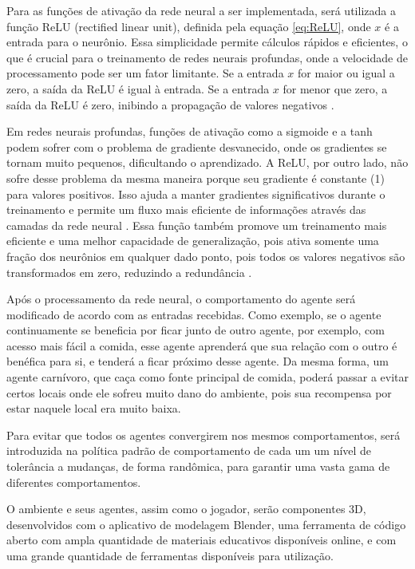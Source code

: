 Para as funções de ativação da rede neural a ser implementada, será utilizada a função ReLU (rectified linear unit), definida pela equação \eqref{eq:ReLU}, onde \( x \) é a entrada para o neurônio. Essa simplicidade permite cálculos rápidos e eficientes, o que é crucial para o treinamento de redes neurais profundas, onde a velocidade de processamento pode ser um fator limitante. Se a entrada \( x \) for maior ou igual a zero, a saída da ReLU é igual à entrada. Se a entrada \( x \) for menor que zero, a saída da ReLU é zero, inibindo a propagação de valores negativos \cite{krizhevsky2012imagenet}.

Em redes neurais profundas, funções de ativação como a sigmoide e a tanh podem sofrer com o problema de gradiente desvanecido, onde os gradientes se tornam muito pequenos, dificultando o aprendizado. A ReLU, por outro lado, não sofre desse problema da mesma maneira porque seu gradiente é constante (1) para valores positivos. Isso ajuda a manter gradientes significativos durante o treinamento e permite um fluxo mais eficiente de informações através das camadas da rede neural \cite{glorot2011understanding}. Essa função também promove um treinamento mais eficiente e uma melhor capacidade de generalização, pois ativa somente uma fração dos neurônios em qualquer dado ponto, pois todos os valores negativos são transformados em zero, reduzindo a redundância \cite{hinton2012layer}.

Após o processamento da rede neural, o comportamento do agente será modificado de acordo com as entradas recebidas. Como exemplo, se o agente continuamente se beneficia por ficar junto de outro agente, por exemplo, com acesso mais fácil a comida, esse agente aprenderá que sua relação com o outro é benéfica para si, e tenderá a ficar próximo desse agente. Da mesma forma, um agente carnívoro, que caça como fonte principal de comida, poderá passar a evitar certos locais onde ele sofreu muito dano do ambiente, pois sua recompensa por estar naquele local era muito baixa.

Para evitar que todos os agentes convergirem nos mesmos comportamentos, será introduzida na política padrão de comportamento de cada um um nível de tolerância a mudanças, de forma randômica, para garantir uma vasta gama de diferentes comportamentos.

O ambiente e seus agentes, assim como o jogador, serão componentes 3D, desenvolvidos com o aplicativo de modelagem Blender, uma ferramenta de código aberto com ampla quantidade de materiais educativos disponíveis online, e com uma grande quantidade de ferramentas disponíveis para utilização.

